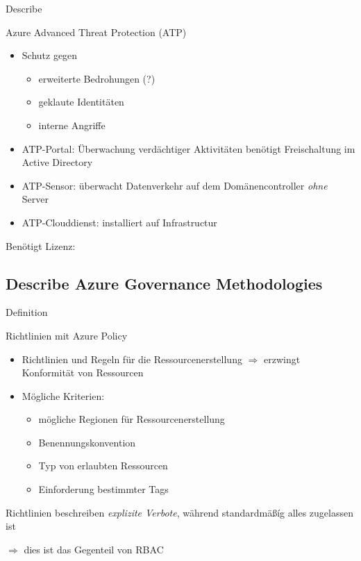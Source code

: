 \documentclass{scrartcl}
\newenvironment{flashcard}[2][]{%
    #1
    \vfill
    \centerline{\Large{#2}}
    \vfill
\newpage
}
{\newpage}
\newcommand{\subsectioncard}[1]{
    \vspace*{\stretch{1}}
    \subsection{#1}
    \vspace*{\stretch{1}}
    \pagebreak
}
\begin{document}
    \begin{flashcard}[Describe]{Azure Advanced Threat Protection (ATP)}
        \begin{itemize}
            \item Schutz gegen 
            \begin{itemize}
                \item erweiterte Bedrohungen (?)
                \item geklaute Identitäten
                \item interne Angriffe
            \end{itemize}
            \item ATP-Portal: Überwachung verdächtiger Aktivitäten\newline
                benötigt Freischaltung im Active Directory
            \item ATP-Sensor: überwacht Datenverkehr auf dem Domänencontroller \emph{ohne} Server
            \item ATP-Clouddienst: installiert auf Infrastructur
        \end{itemize}
        Benötigt Lizenz:
    \end{flashcard}

    \subsectioncard{Describe Azure Governance Methodologies}

    \begin{flashcard}[Definition]{Richtlinien mit Azure Policy}
        \begin{itemize}
            \item Richtlinien und Regeln für die Ressourcenerstellung\newline
            $\Rightarrow$ erzwingt Konformität von Ressourcen
            \item Mögliche Kriterien:
            \begin{itemize}
                \item mögliche Regionen für Ressourcenerstellung
                \item Benennungskonvention
                \item Typ von erlaubten Ressourcen
                \item Einforderung bestimmter Tags
            \end{itemize}
        \end{itemize}
        
        \vspace{5mm}
        Richtlinien beschreiben \emph{explizite Verbote}, während standardmäßíg alles zugelassen ist
        
        $\Rightarrow$ dies ist das Gegenteil von RBAC
    \end{flashcard}
\end{document}
